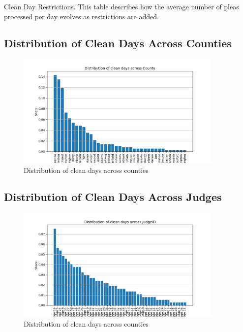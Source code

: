 \documentclass[11pt]{article}
\begin{document}
    \begin{table}[H]
      \centering
      \small
      \caption{Clean Day Restrictions. This table describes how the average number of pleas processed per day evolves as restrictions are added.}
      \label{clean-day-rest}
      
    \end{table}

  \subsection{Distribution of Clean Days Across Counties}
    \begin{figure}[H]
      \includegraphics[width=0.9\textwidth]{../../../output/figures/Exploration/clean_day_dist_County.png}
      \caption{Distribution of clean days across counties}
    \end{figure}

  \subsection{Distribution of Clean Days Across Judges}
    \begin{figure}[H]
      \includegraphics[width=0.9\textwidth]{../../../output/figures/Exploration/clean_day_dist_JudgeID.png}
      \caption{Distribution of clean days across counties}
    \end{figure}
\end{document}
